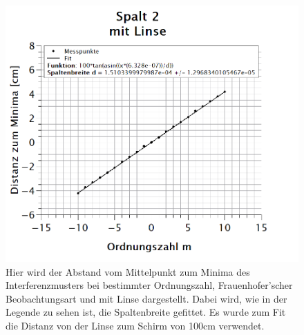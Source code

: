 \begin{figure}[h]
\centering
\includegraphics[width=\textwidth]{Bilder/spalt2_mitLinse.png} 
\vspace*{-1cm}
\caption[Spalt 2: mit Linse]{Hier wird der Abstand vom Mittelpunkt zum Minima des Interferenzmusters bei bestimmter Ordnungszahl, Frauenhofer'scher Beobachtungsart und mit Linse dargestellt. Dabei wird, wie in der Legende zu sehen ist, die Spaltenbreite gefittet. Es wurde zum Fit die Distanz von der Linse zum Schirm von 100cm verwendet.}
\label{fig:spalt2_mitLinse}
\end{figure}
\newpage

